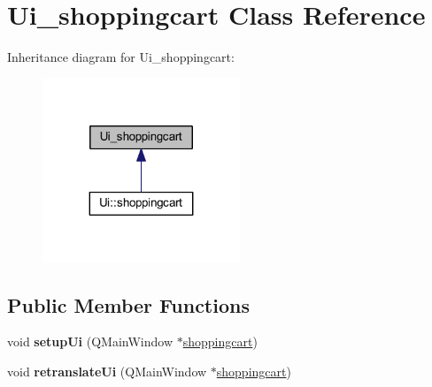 \hypertarget{class_ui__shoppingcart}{}\section{Ui\+\_\+shoppingcart Class Reference}
\label{class_ui__shoppingcart}


Inheritance diagram for Ui\+\_\+shoppingcart\+:
\nopagebreak
\begin{figure}[H]
\begin{center}
\leavevmode
\includegraphics[width=167pt]{class_ui__shoppingcart__inherit__graph}
\end{center}
\end{figure}
\subsection*{Public Member Functions}
\begin{DoxyCompactItemize}
\item 
\mbox{\label{class_ui__shoppingcart_a30e910336259b742b00fafc69d3af32b}} 
void {\bfseries setup\+Ui} (Q\+Main\+Window $\ast$\hyperlink{classshoppingcart}{shoppingcart})
\item 
\mbox{\label{class_ui__shoppingcart_a91b8f6dcabcdeed083050e20f00202ca}} 
void {\bfseries retranslate\+Ui} (Q\+Main\+Window $\ast$\hyperlink{classshoppingcart}{shoppingcart})
\end{DoxyCompactItemize}
